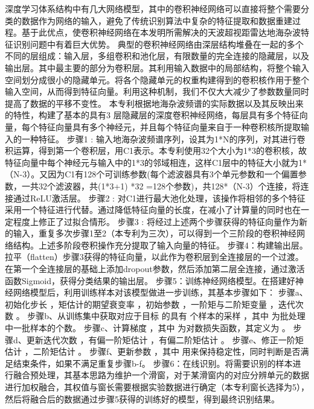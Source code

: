 深度学习体系结构中有几大网络模型，其中的卷积神经网络可以直接将整个需要分类的数据作为网络的输入，避免了传统识别算法中复杂的特征提取和数据重建过程。基于此优点，使卷积神经网络在本发明所需解决的天波超视距雷达地海杂波特征识别问题中有着巨大优势。
典型的卷积神经网络由深层结构堆叠在一起的多个不同的层组成：输入层，多组卷积和池化层，有限数量的完全连接的隐藏层，以及输出层。其中最主要的部分为卷积层。其利用输入数据中的局部结构，将整个输入空间划分成很小的隐藏单元。将各个隐藏单元的权重构建得到的卷积核作用于整个输入空间，从而得到特征向量。利用这种机制，我们不仅大大减少了参数数量同时提高了数据的平移不变性。
本专利根据地海杂波频谱的实际数据以及其反映出来的特性，构建了基本的具有3 层隐藏层的深度卷积神经网络，每层具有多个特征向量，每个特征向量具有多个神经元，并且每个特征向量来自于一种卷积核所提取输入的一种特征。
步骤1 : 输入地海杂波频谱序列，设其为1*N的序列，对其进行卷积运算，得到第一个卷积层，用C1表示。本专利使用32个大小为1*3的卷积核，故特征向量中每个神经元与输入中的1*3的邻域相连，这样C1层中的特征大小就为1*（N-3）。又因为C1有128个可训练参数(每个滤波器具有3个单元参数和一个偏置参数，一共32个滤波器，共(1*3+1) *32 =128个参数)，共128*（N-3）个连接，将连接通过ReLU激活层。
步骤2 : 对C1进行最大池化处理，该操作将相邻的多个特征采用一个特征进行代替。通过降低特征向量的长度，在减小了计算量的同时也在一定程度上修正了过拟合情形。
步骤3 : 将经过上述两个步骤获得的特征向量作为新的输入，重复多次步骤1至2（本专利为三次），可以得到一个三阶段的卷积神经网络结构。上述多阶段卷积操作充分提取了输入向量的特征。
步骤4：构建输出层。拉平（flatten）步骤3获得的特征向量，以此作为卷积层到全连接层的一个过渡。在第一个全连接层的基础上添加dropout参数，然后添加第二层全连接，通过激活函数Sigmoid，获得分类结果的输出层。
步骤5：训练神经网络模型。在搭建好神经网络模型后，利用训练样本对该模型做进一步训练，其基本步骤如下：
步骤a、 初始化步长 ，矩估计的期望衰变率 ，初始参数 ，一阶矩与二阶矩变量 ，迭代次数 。
步骤b、从训练集中获取对应于目标 的具有 个样本的采样 ，其中 为批处理中一批样本的个数。
步骤c、计算梯度  ，其中 为对数损失函数，其定义为 。
步骤d、更新迭代次数 ，有偏一阶矩估计 ，有偏二阶矩估计 。
步骤e、修正一阶矩估计 ，二阶矩估计 。
步骤f、更新参数  ，其中 用来保持稳定性，同时判断是否满足结束条件，如果不满足重复步骤b-f。
步骤6：在线识别。将需要识别的样本进行融合预处理，其基本思路为维护一个滑窗，对于某滑窗内的对应分辨单元的数据进行加权融合，其权值与窗长需要根据实验数据进行确定（本专利窗长选择为5），然后将融合后的数据通过步骤5获得的训练好的模型，得到最终识别结果。


